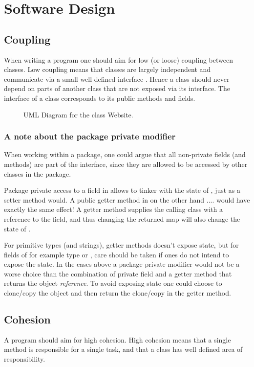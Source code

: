  \section{Software Design}

 \subsection{Coupling}
When writing a program one should aim for low (or loose) coupling between classes. Low coupling means that classes are largely independent and communicate via a small well-defined interface \cite[p.259]{BK}. Hence a class should never depend on parts of another class that are not exposed via its interface. The interface of a class corresponds to its public methods and fields.

 \begin{figure}[t]
	\centering
	\caption{UML Diagram for the class Website.}
	\label{fig:uml:single-class-website}
\end{figure}


 \subsubsection{A note about the package private modifier}
When working within a package, one could argue that all non-private fields (and methods) are part of the interface, since they are allowed to be accessed by other classes in the package. 
 
Package private access to a field in  allows  to tinker with the state of , just as a setter method would.
A public getter method in  on the other hand .... would have exactly the same effect!
A getter method supplies the calling class  with a reference to the field, and thus changing the returned map will also change the state of .
 
For primitive types (and strings), getter methods doesn't expose state, but for fields of for example type   or , care should be taken if ones do not intend to expose the state.
In the cases above a package private modifier would not be a worse choice than the combination of private field and a getter method that returns the object \emph{reference}. To avoid exposing state one could choose to clone/copy the object and then return the clone/copy in the getter method. 


\subsection{Cohesion}
A program should aim for high cohesion. High cohesion means that a single method is responsible for a single task, and that a class has well defined area of responsibility. 

